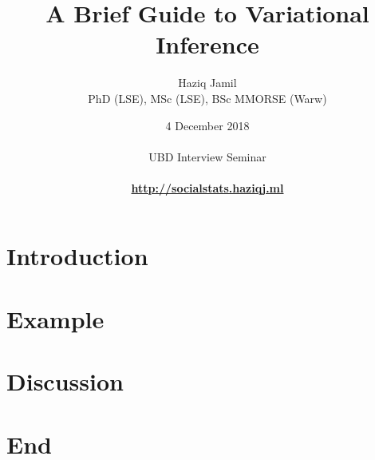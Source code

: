 \documentclass[]{beamer}
\begin{document}

\title[Variational inference]{A Brief Guide to Variational Inference}
\author[Haziq Jamil]{
  \large{Haziq Jamil}\\
  {\scriptsize PhD (LSE), MSc (LSE), BSc MMORSE (Warw)}
}
\date[Nov 2018]{
  4 December 2018\\
  \hspace{1cm}\\
  UBD Interview Seminar\\
  \hspace{1cm}\\
  \href{http://socialstats.haziqj.ml}{\color{fu-red!60} \textbf{http://socialstats.haziqj.ml}}
}

\mytitle

\mytoc


\section{Introduction}


\section[Example]{Example}
\transition



\section{Discussion}
\transition


\section*{End}
\thankyou
\end{document}
